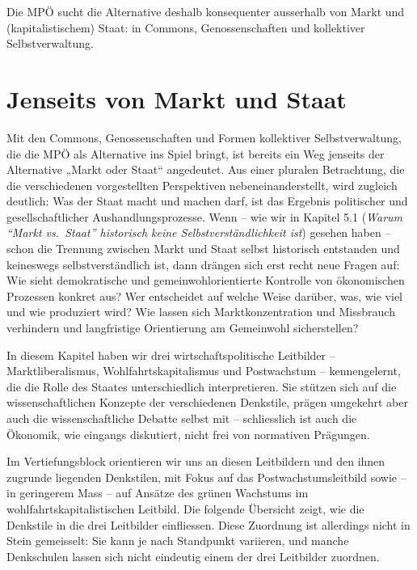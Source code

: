 \documentclass[
  nswissgerman,
  a4paper,
  DIV=11,
  numbers=noendperiod,
  oneside,
  openany]{scrreprt}
\begin{document}
Die MPÖ sucht die Alternative deshalb konsequenter ausserhalb von Markt
und (kapitalistischem) Staat: in Commons, Genossenschaften und
kollektiver Selbstverwaltung.

\section{Jenseits von Markt und
Staat}\label{jenseits-von-markt-und-staat}

Mit den Commons, Genossenschaften und Formen kollektiver
Selbstverwaltung, die die MPÖ als Alternative ins Spiel bringt, ist
bereits ein Weg jenseits der Alternative „Markt oder Staat`` angedeutet.
Aus einer pluralen Betrachtung, die die verschiedenen vorgestellten
Perspektiven nebeneinanderstellt, wird zugleich deutlich: Was der Staat
macht und machen darf, ist das Ergebnis politischer und
gesellschaftlicher Aushandlungsprozesse. Wenn -- wie wir in Kapitel 5.1
(\emph{Warum ``Markt vs.~Staat'' historisch keine Selbstverständlichkeit
ist}) gesehen haben -- schon die Trennung zwischen Markt und Staat
selbst historisch entstanden und keineswegs selbstverständlich ist, dann
drängen sich erst recht neue Fragen auf: Wie sieht demokratische und
gemeinwohlorientierte Kontrolle von ökonomischen Prozessen konkret aus?
Wer entscheidet auf welche Weise darüber, was, wie viel und wie
produziert wird? Wie lassen sich Marktkonzentration und Missbrauch
verhindern und langfristige Orientierung am Gemeinwohl sicherstellen?

In diesem Kapitel haben wir drei wirtschaftspolitische Leitbilder --
Marktliberalismus, Wohlfahrtskapitalismus und Postwachstum --
kennengelernt, die die Rolle des Staates unterschiedlich interpretieren.
Sie stützen sich auf die wissenschaftlichen Konzepte der verschiedenen
Denkstile, prägen umgekehrt aber auch die wissenschaftliche Debatte
selbst mit -- schliesslich ist auch die Ökonomik, wie eingangs
diskutiert, nicht frei von normativen Prägungen.

Im Vertiefungsblock orientieren wir uns an diesen Leitbildern und den
ihnen zugrunde liegenden Denkstilen, mit Fokus auf das
Postwachstumsleitbild sowie -- in geringerem Mass -- auf Ansätze des
grünen Wachstums im wohlfahrtskapitalistischen Leitbild. Die folgende
Übersicht zeigt, wie die Denkstile in die drei Leitbilder einfliessen.
Diese Zuordnung ist allerdings nicht in Stein gemeisselt: Sie kann je
nach Standpunkt variieren, und manche Denkschulen lassen sich nicht
eindeutig einem der drei Leitbilder zuordnen.
\end{document}
